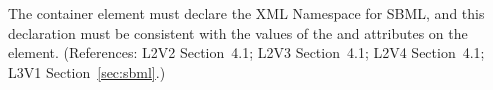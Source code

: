 The  container element must declare the XML Namespace
for SBML, and this declaration must be consistent with the values
of the  and  attributes on the 
 element.  (References: L2V2 Section~4.1;
L2V3 Section~4.1; L2V4 Section~4.1; L3V1 Section~\ref{sec:sbml}.)
